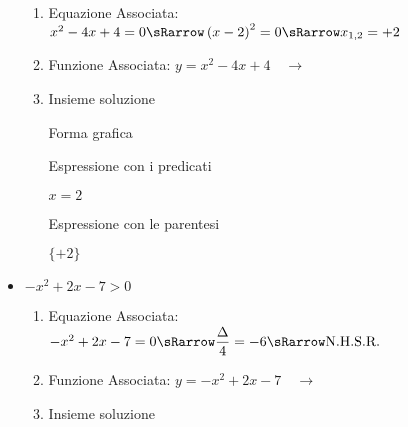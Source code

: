 \begin{esempio}
\begin{itemize}
\begin{enumerate}
 \item
  Equazione Associata:~\(x^2-4x+4=0 \sRarrow
                        \left(x-2 \right)^2=0 \sRarrow
                        x_{1,2}=+2\)
 \item
  \begin{minipage}{.45\textwidth}
  Funzione Associata: \(y = x^2-4x+4 \quad \rightarrow\)
  \end{minipage}
  \begin{minipage}{.30\textwidth}
  \end{minipage}
 \item
 Insieme soluzione\\

  \begin{minipage}{.32\textwidth}
  Forma grafica\\[-.7em]

 \begin{center}
  \vspace{.4em}
 \end{center}
  \end{minipage}
  \begin{minipage}{.32\textwidth}
  Espressione con i predicati\\[-.3em]

 \begin{center}
  \(x=2\)
  \vspace{1em}
 \end{center}
  \end{minipage}
  \begin{minipage}{.32\textwidth}
  Espressione con le parentesi\\[-.3em]

 \begin{center}
  \(\lbrace +2 \rbrace\)
  \vspace{.8em}
 \end{center}
  \end{minipage}
\end{enumerate}

\item \(-x^2+2x-7>0\)

\begin{enumerate}
 \item
  Equazione Associata:~\(-x^2+2x-7=0 \sRarrow
                        \dfrac{\Delta}{4} = -6 \sRarrow
                        \text{N.H.S.R.}\)
 \item
  \begin{minipage}{.45\textwidth}
  Funzione Associata: \(y = -x^2+2x-7 \quad \rightarrow\)
  \end{minipage}
  \begin{minipage}{.30\textwidth}
  \parabolaamidmi
  \end{minipage}
 \item
 Insieme soluzione\\


\end{enumerate}
\end{itemize}
\end{esempio}

